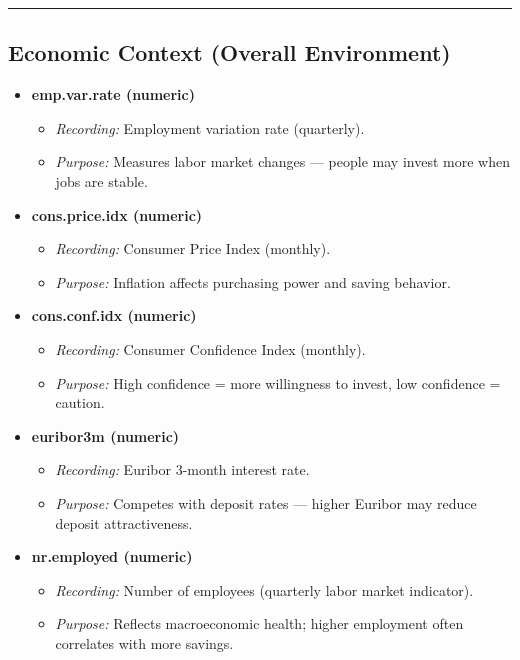 \documentclass[
]{article}
\providecommand{\tightlist}{%
  \setlength{\itemsep}{0pt}\setlength{\parskip}{0pt}}
\begin{document}
\begin{center}\rule{0.5\linewidth}{0.5pt}\end{center}

\subsection{Economic Context (Overall
Environment)}\label{economic-context-overall-environment}

\begin{itemize}
\tightlist
\item
  \textbf{emp.var.rate (numeric)}

  \begin{itemize}
  \tightlist
  \item
    \emph{Recording:} Employment variation rate (quarterly).\\
  \item
    \emph{Purpose:} Measures labor market changes --- people may invest
    more when jobs are stable.
  \end{itemize}
\item
  \textbf{cons.price.idx (numeric)}

  \begin{itemize}
  \tightlist
  \item
    \emph{Recording:} Consumer Price Index (monthly).\\
  \item
    \emph{Purpose:} Inflation affects purchasing power and saving
    behavior.
  \end{itemize}
\item
  \textbf{cons.conf.idx (numeric)}

  \begin{itemize}
  \tightlist
  \item
    \emph{Recording:} Consumer Confidence Index (monthly).\\
  \item
    \emph{Purpose:} High confidence = more willingness to invest, low
    confidence = caution.
  \end{itemize}
\item
  \textbf{euribor3m (numeric)}

  \begin{itemize}
  \tightlist
  \item
    \emph{Recording:} Euribor 3-month interest rate.\\
  \item
    \emph{Purpose:} Competes with deposit rates --- higher Euribor may
    reduce deposit attractiveness.
  \end{itemize}
\item
  \textbf{nr.employed (numeric)}

  \begin{itemize}
  \tightlist
  \item
    \emph{Recording:} Number of employees (quarterly labor market
    indicator).\\
  \item
    \emph{Purpose:} Reflects macroeconomic health; higher employment
    often correlates with more savings.
  \end{itemize}
\end{itemize}
\end{document}
